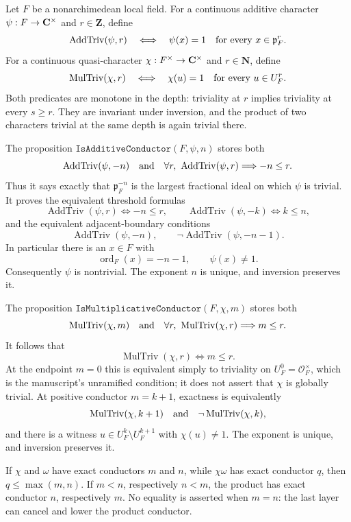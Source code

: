 \begin{definition}\label{mod:basic-characterconductors}
Let $F$ be a nonarchimedean local field.  For a continuous additive
character $\psi:F\to\mathbf C^\times$ and $r\in\mathbf Z$, define
\[
 \operatorname{AddTriv}(\psi,r)
 \quad\Longleftrightarrow\quad
 \psi(x)=1\quad\hbox{for every }x\in\mathfrak p_F^r.
\]
For a continuous quasi-character $\chi:F^\times\to\mathbf C^\times$ and
$r\in\mathbf N$, define
\[
 \operatorname{MulTriv}(\chi,r)
 \quad\Longleftrightarrow\quad
 \chi(u)=1\quad\hbox{for every }u\in U_F^r.
\]
Both predicates are monotone in the depth: triviality at $r$ implies
triviality at every $s\ge r$.  They are invariant under inversion, and the
product of two characters trivial at the same depth is again trivial there.

The proposition
$\texttt{IsAdditiveConductor}(F,\psi,n)$ stores both
\[
 \operatorname{AddTriv}(\psi,-n)
 \quad\hbox{and}\quad
 \forall r,\ \operatorname{AddTriv}(\psi,r)\Longrightarrow -n\le r.
\]
Thus it says exactly that $\mathfrak p_F^{-n}$ is the largest fractional
ideal on which $\psi$ is trivial.  It proves the equivalent threshold
formulas
\[
 \operatorname{AddTriv}(\psi,r)\Longleftrightarrow -n\le r,
 \qquad
 \operatorname{AddTriv}(\psi,-k)\Longleftrightarrow k\le n,
\]
and the equivalent adjacent-boundary conditions
\[
 \operatorname{AddTriv}(\psi,-n),
 \qquad
 \neg\operatorname{AddTriv}(\psi,-n-1).
\]
In particular there is an $x\in F$ with
\[
 \operatorname{ord}_F(x)=-n-1,
 \qquad \psi(x)\ne1.
\]
Consequently $\psi$ is nontrivial.  The exponent $n$ is unique, and
inversion preserves it.

The proposition
$\texttt{IsMultiplicativeConductor}(F,\chi,m)$ stores both
\[
 \operatorname{MulTriv}(\chi,m)
 \quad\hbox{and}\quad
 \forall r,\ \operatorname{MulTriv}(\chi,r)\Longrightarrow m\le r.
\]
It follows that
\[
 \operatorname{MulTriv}(\chi,r)\Longleftrightarrow m\le r.
\]
At the endpoint $m=0$ this is equivalent simply to triviality on
$U_F^0=\mathcal O_F^\times$, which is the manuscript's unramified condition;
it does not assert that $\chi$ is globally trivial.  At positive conductor
$m=k+1$, exactness is equivalently
\[
 \operatorname{MulTriv}(\chi,k+1)
 \quad\hbox{and}\quad
 \neg\operatorname{MulTriv}(\chi,k),
\]
and there is a witness
$u\in U_F^k\setminus U_F^{k+1}$ with $\chi(u)\ne1$.
The exponent is unique, and inversion preserves it.

If $\chi$ and $\omega$ have exact conductors $m$ and $n$, while
$\chi\omega$ has exact conductor $q$, then
$q\le\max(m,n)$.  If $m<n$, respectively $n<m$, the product has exact
conductor $n$, respectively $m$.  No equality is asserted when $m=n$:
the last layer can cancel and lower the product conductor.


\end{definition}
